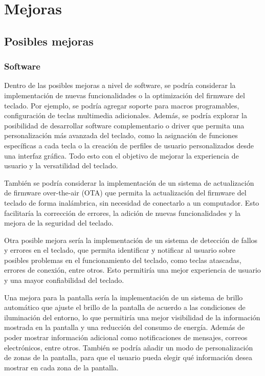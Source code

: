 \chapter{Mejoras}

\section{Posibles mejoras}
\subsection{Software}
Dentro de las posibles mejoras a nivel de software, se podría considerar la implementación de nuevas funcionalidades o la optimización del firmware del teclado. Por ejemplo, se podría agregar soporte para macros programables, configuración de teclas multimedia adicionales. Además, se podría explorar la posibilidad de desarrollar software complementario o driver que permita una personalización más avanzada del teclado, como la asignación de funciones específicas a cada tecla o la creación de perfiles de usuario personalizados desde una interfaz gráfica. Todo esto con el objetivo de mejorar la experiencia de usuario y la versatilidad del teclado.

También se podría considerar la implementación de un sistema de actualización de firmware over-the-air (OTA) que permita la actualización del firmware del teclado de forma inalámbrica, sin necesidad de conectarlo a un computador. Esto facilitaría la corrección de errores, la adición de nuevas funcionalidades y la mejora de la seguridad del teclado.

Otra posible mejora sería la implementación de un sistema de detección de fallos y errores en el teclado, que permita identificar y notificar al usuario sobre posibles problemas en el funcionamiento del teclado, como teclas atascadas, errores de conexión, entre otros. Esto permitiría una mejor experiencia de usuario y una mayor confiabilidad del teclado.

Una mejora para la pantalla sería la implementación de un sistema de brillo automático que ajuste el brillo de la pantalla de acuerdo a las condiciones de iluminación del entorno, lo que permitiría una mejor visibilidad de la información mostrada en la pantalla y una reducción del consumo de energía. Además de poder mostrar información adicional como notificaciones de mensajes, correos electrónicos, entre otros. También se podría añadir un modo de personalización de zonas de la pantalla, para que el usuario pueda elegir qué información desea mostrar en cada zona de la pantalla.

